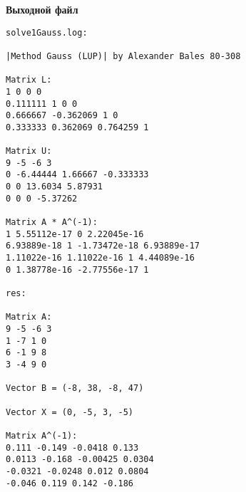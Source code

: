 \textbf{Выходной файл}
\begin{verbatim}
solve1Gauss.log:

|Method Gauss (LUP)| by Alexander Bales 80-308

Matrix L:
1 0 0 0 
0.111111 1 0 0 
0.666667 -0.362069 1 0 
0.333333 0.362069 0.764259 1 

Matrix U:
9 -5 -6 3 
0 -6.44444 1.66667 -0.333333 
0 0 13.6034 5.87931 
0 0 0 -5.37262 

Matrix A * A^(-1):
1 5.55112e-17 0 2.22045e-16 
6.93889e-18 1 -1.73472e-18 6.93889e-17 
1.11022e-16 1.11022e-16 1 4.44089e-16 
0 1.38778e-16 -2.77556e-17 1 

res:

Matrix A:
9 -5 -6 3 
1 -7 1 0 
6 -1 9 8 
3 -4 9 0 

Vector B = (-8, 38, -8, 47)

Vector X = (0, -5, 3, -5)

Matrix A^(-1):
0.111 -0.149 -0.0418 0.133 
0.0113 -0.168 -0.00425 0.0304 
-0.0321 -0.0248 0.012 0.0804 
-0.046 0.119 0.142 -0.186 
\end{verbatim}

\pagebreak
